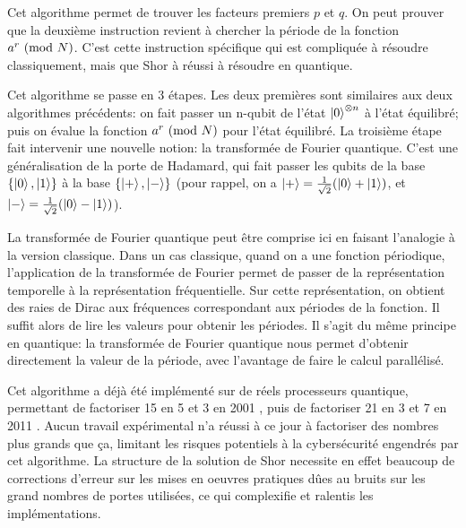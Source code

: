 \begin{algorithm}[H]
  \SetAlgoLined
\end{algorithm}

Cet algorithme permet de trouver les facteurs premiers $p$ et $q$. On peut prouver que la deuxième instruction revient à chercher la période de la fonction $a^r \ (\mathrm{mod}\ N)$. C'est cette instruction spécifique qui est compliquée à résoudre classiquement, mais que Shor à réussi à résoudre en quantique.

Cet algorithme se passe en 3 étapes. Les deux premières sont similaires aux deux algorithmes précédents: on fait passer un n-qubit de l'état $\ket{0}^{\otimes n}$ à l'état équilibré; puis on évalue la fonction $a^r \ (\mathrm{mod}\ N)$ pour l'état équilibré. La troisième étape fait intervenir une nouvelle notion: la transformée de Fourier quantique. C'est une généralisation de la porte de Hadamard, qui fait passer les qubits de la base $\{\ket{0}, \ket{1}\}$ à la base $\{\ket{+}, \ket{-}\}$ (pour rappel, on a $\ket{+} = \frac{1}{\sqrt{2}}(\ket{0} + \ket{1})$, et $\ket{-} = \frac{1}{\sqrt{2}}(\ket{0} - \ket{1})$).

La transformée de Fourier quantique peut être comprise ici en faisant l'analogie à la version classique. Dans un cas classique, quand on a une fonction périodique, l'application de la transformée de Fourier permet de passer de la représentation temporelle à la représentation fréquentielle. Sur cette représentation, on obtient des raies de Dirac aux fréquences correspondant aux périodes de la fonction. Il suffit alors de lire les valeurs pour obtenir les périodes. Il s'agit du même principe en quantique: la transformée de Fourier quantique nous permet d'obtenir directement la valeur de la période, avec l'avantage de faire le calcul parallélisé.

\medbreak

Cet algorithme a déjà été implémenté sur de réels processeurs quantique, permettant de factoriser 15 en 5 et 3 en 2001 \cite{Vandersypen01}, puis de factoriser 21 en 3 et 7 en 2011 \cite{Martin11}. Aucun travail expérimental n'a réussi à ce jour à factoriser des nombres plus grands que ça, limitant les risques potentiels à la cybersécurité engendrés par cet algorithme. La structure de la solution de Shor necessite en effet beaucoup de corrections d'erreur sur les mises en oeuvres pratiques dûes au bruits sur les grand nombres de portes utilisées, ce qui complexifie et ralentis les implémentations.

